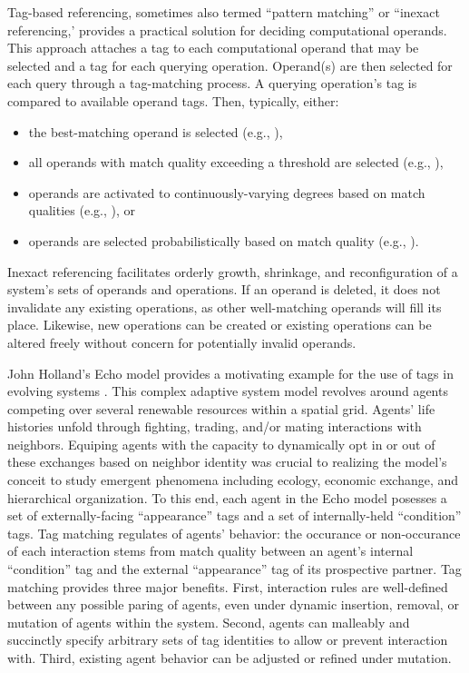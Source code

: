 Tag-based referencing, sometimes also termed ``pattern matching'' or ``inexact referencing,' provides a practical solution for deciding computational operands.
This approach attaches a tag to each computational operand that may be selected and a tag for each querying operation.
Operand(s) are then selected for each query through a tag-matching process.
A querying operation's tag is compared to available operand tags.
Then, typically, either:
\begin{itemize}
  \item the best-matching operand is selected (e.g., \cite{spector2012tag}),
  \item all operands with match quality exceeding a threshold are selected (e.g., \cite{riolo2001evolution}),
  \item operands are activated to continuously-varying degrees based on match qualities (e.g., \cite{banzhaf2003artificial}), or
  \item operands are selected probabilistically based on match quality (e.g., \cite{seiden1992simulation}).
\end{itemize}

Inexact referencing facilitates orderly growth, shrinkage, and reconfiguration of a system's sets of operands and operations.
If an operand is deleted, it does not invalidate any existing operations, as other well-matching operands will fill its place.
Likewise, new operations can be created or existing operations can be altered freely without concern for potentially invalid operands.

John Holland's Echo model provides a motivating example for the use of tags in evolving systems \citep{holland1992adaptation, mitchell1994genetic}.
This complex adaptive system model revolves around agents competing over several renewable resources within a spatial grid.
Agents' life histories unfold through fighting, trading, and/or mating interactions with neighbors.
Equiping agents with the capacity to dynamically opt in or out of these exchanges based on neighbor identity was crucial to realizing the model's conceit to study emergent phenomena including ecology, economic exchange, and hierarchical organization.
To this end, each agent in the Echo model posesses a set of externally-facing ``appearance'' tags and a set of internally-held ``condition'' tags.
Tag matching regulates of agents' behavior: the occurance or non-occurance of each interaction stems from match quality between an agent's internal ``condition'' tag and the external ``appearance'' tag of its prospective partner.
Tag matching provides three major benefits.
First, interaction rules are well-defined between any possible paring of agents, even under dynamic insertion, removal, or mutation of agents within the system.
Second, agents can malleably and succinctly specify arbitrary sets of tag identities to allow or prevent interaction with.
Third, existing agent behavior can be adjusted or refined under mutation.


